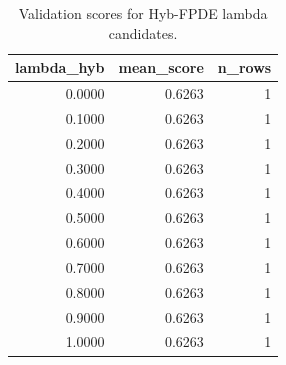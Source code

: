\begin{table}[t]
\caption{Validation scores for Hyb-FPDE lambda candidates.}
\label{tab:lambda_distribution_computed}
\centering
\begin{tabular}{rrr}
\toprule
lambda\_hyb & mean\_score & n\_rows \\
\midrule
0.0000 & 0.6263 & 1 \\
0.1000 & 0.6263 & 1 \\
0.2000 & 0.6263 & 1 \\
0.3000 & 0.6263 & 1 \\
0.4000 & 0.6263 & 1 \\
0.5000 & 0.6263 & 1 \\
0.6000 & 0.6263 & 1 \\
0.7000 & 0.6263 & 1 \\
0.8000 & 0.6263 & 1 \\
0.9000 & 0.6263 & 1 \\
1.0000 & 0.6263 & 1 \\
\bottomrule
\end{tabular}

\end{table}
